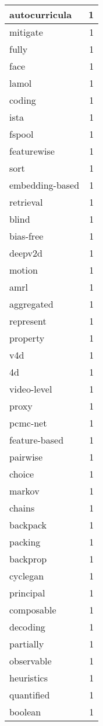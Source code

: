 \begin{table}[h]
\begin{tabular}{|l|r|}
\hline
autocurricula & 1 \\
\hline
mitigate & 1 \\
\hline
fully & 1 \\
\hline
face & 1 \\
\hline
lamol & 1 \\
\hline
coding & 1 \\
\hline
ista & 1 \\
\hline
fspool & 1 \\
\hline
featurewise & 1 \\
\hline
sort & 1 \\
\hline
embedding-based & 1 \\
\hline
retrieval & 1 \\
\hline
blind & 1 \\
\hline
bias-free & 1 \\
\hline
deepv2d & 1 \\
\hline
motion & 1 \\
\hline
amrl & 1 \\
\hline
aggregated & 1 \\
\hline
represent & 1 \\
\hline
property & 1 \\
\hline
v4d & 1 \\
\hline
4d & 1 \\
\hline
video-level & 1 \\
\hline
proxy & 1 \\
\hline
pcmc-net & 1 \\
\hline
feature-based & 1 \\
\hline
pairwise & 1 \\
\hline
choice & 1 \\
\hline
markov & 1 \\
\hline
chains & 1 \\
\hline
backpack & 1 \\
\hline
packing & 1 \\
\hline
backprop & 1 \\
\hline
cyclegan & 1 \\
\hline
principal & 1 \\
\hline
composable & 1 \\
\hline
decoding & 1 \\
\hline
partially & 1 \\
\hline
observable & 1 \\
\hline
heuristics & 1 \\
\hline
quantified & 1 \\
\hline
boolean & 1 \\

\end{tabular}
\end{table}
